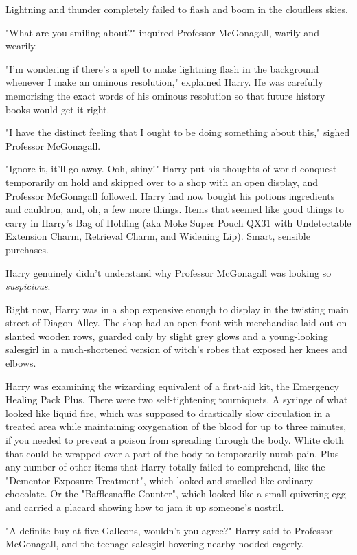 Lightning and thunder completely failed to flash and boom in the cloudless 
skies.

"What are you smiling about?" inquired Professor McGonagall, warily and wearily.

"I'm wondering if there's a spell to make lightning flash in the background 
whenever I make an ominous resolution," explained Harry. He was carefully 
memorising the exact words of his ominous resolution so that future history 
books would get it right.

"I have the distinct feeling that I ought to be doing something about this," 
sighed Professor McGonagall.

"Ignore it, it'll go away. Ooh, shiny!" Harry put his thoughts of world 
conquest temporarily on hold and skipped over to a shop with an open display, 
and Professor McGonagall followed.
\sbreak
Harry had now bought his potions ingredients and cauldron, and, oh, a few more 
things. Items that seemed like good things to carry in Harry's Bag of Holding 
(aka Moke Super Pouch QX31 with Undetectable Extension Charm, Retrieval Charm, 
and Widening Lip). Smart, sensible purchases.

Harry genuinely didn't understand why Professor McGonagall was looking so 
\emph{suspicious}.

Right now, Harry was in a shop expensive enough to display in the twisting main 
street of Diagon Alley. The shop had an open front with merchandise laid out on 
slanted wooden rows, guarded only by slight grey glows and a young-looking 
salesgirl in a much-shortened version of witch's robes that exposed her knees 
and elbows.

Harry was examining the wizarding equivalent of a first-aid kit, the Emergency 
Healing Pack Plus. There were two self-tightening tourniquets. A syringe of 
what looked like liquid fire, which was supposed to drastically slow 
circulation in a treated area while maintaining oxygenation of the blood for up 
to three minutes, if you needed to prevent a poison from spreading through the 
body. White cloth that could be wrapped over a part of the body to temporarily 
numb pain. Plus any number of other items that Harry totally failed to 
comprehend, like the "Dementor Exposure Treatment", which looked and smelled 
like ordinary chocolate. Or the "Bafflesnaffle Counter", which looked like a 
small quivering egg and carried a placard showing how to jam it up someone's 
nostril.

"A definite buy at five Galleons, wouldn't you agree?" Harry said to Professor 
McGonagall, and the teenage salesgirl hovering nearby nodded eagerly.

